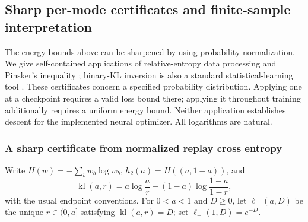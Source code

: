 \subsection{Sharp per-mode certificates and finite-sample interpretation}
\label{app:theory-survival-certificates}

The energy bounds above can be sharpened by using probability normalization.
We give self-contained applications of relative-entropy data processing and
Pinsker's inequality \citep[Theorems~9 and~31]{vanerven2014renyi}; binary-KL inversion is also a
standard statistical-learning tool \citep{garivier2011klucb}. These certificates
concern a specified probability distribution. Applying one at a checkpoint
requires a valid loss bound there; applying it throughout training additionally
requires a uniform energy bound. Neither application establishes descent for
the implemented neural optimizer. All logarithms are natural.

\subsubsection{A sharp certificate from normalized replay cross entropy}

Write $H(w)=-\sum_b w_b\log w_b$, $h_2(a)=H((a,1-a))$, and
\[
 \operatorname{kl}(a,r)
 =a\log\frac{a}{r}+(1-a)\log\frac{1-a}{1-r},
\]
with the usual endpoint conventions. For $0<a<1$ and $D\ge0$, let
$\ell_-(a,D)$ be the unique $r\in(0,a]$ satisfying
$\operatorname{kl}(a,r)=D$; set $\ell_-(1,D)=e^{-D}$.

